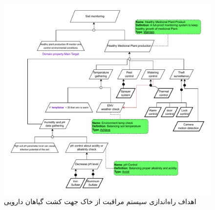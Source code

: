 \documentclass[a4paper]{report}
\begin{document}
\begin{figure}[H]
    \centering
    \includegraphics[width=1.0\textwidth]{assets/diagrams/soil_monitoring_goal_diagram.drawio.pdf}
    \caption{اهداف راه‌اندازی سیستم مراقبت از خاک جهت کشت گیاهان دارویی}
\end{figure}
\end{document}
